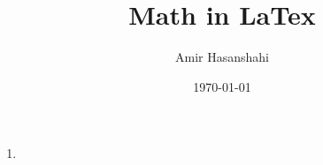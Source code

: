 \documentclass{article}
\title{Math in LaTex}
\author{Amir Hasanshahi}
\date{\today}
\begin{document}
	\maketitle
	
    \begin{enumerate}
        \item {}
    \end{enumerate}
\end{document}
